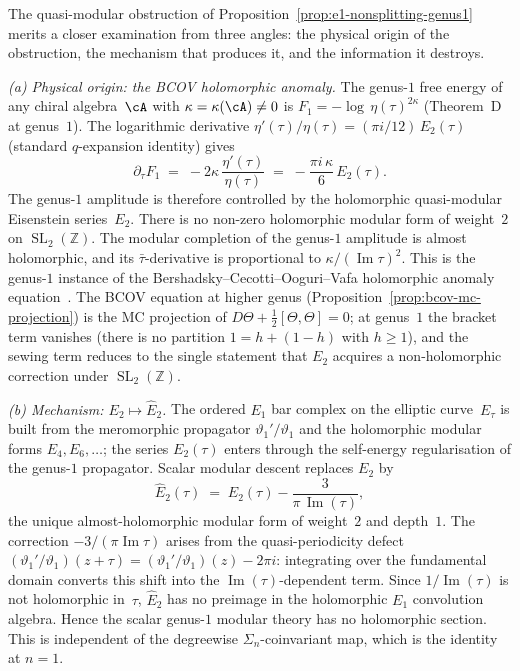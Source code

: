 \begin{remark}
\label{rem:genus1-nonsplitting-anomaly}
The quasi-modular obstruction of
Proposition~\ref{prop:e1-nonsplitting-genus1} merits a closer
examination from three angles: the physical origin of the
obstruction, the mechanism that produces it, and the information
it destroys.

\emph{(a) Physical origin: the BCOV holomorphic anomaly.}
The genus-$1$ free energy of any chiral algebra~$\cA$ with
$\kappa = \kappa(\cA) \neq 0$ is
$F_1 = -\log\,\eta(\tau)^{2\kappa}$
\textup{(}Theorem~D at genus~$1$\textup{)}.
The logarithmic derivative
$\eta'(\tau)/\eta(\tau) = (\pi i/12)\,E_2(\tau)$
\textup{(}standard $q$-expansion identity\textup{)} gives
\[
 \partial_\tau F_1
 \;=\;
 -2\kappa\,\frac{\eta'(\tau)}{\eta(\tau)}
 \;=\;
 -\frac{\pi i\,\kappa}{6}\,E_2(\tau).
\]
The genus-$1$ amplitude is therefore controlled by the holomorphic
quasi-modular Eisenstein series~$E_2$.  There is no non-zero
holomorphic modular form of weight~$2$ on
$\operatorname{SL}_2(\mathbb{Z})$.  The modular completion of the
genus-$1$ amplitude is almost holomorphic, and its
$\bar{\tau}$-derivative is proportional to
$\kappa/(\operatorname{Im}\tau)^2$.  This is the genus-$1$ instance
of the Bershadsky--Cecotti--Ooguri--Vafa holomorphic anomaly
equation~\cite{BCOV93}.
The BCOV equation at higher genus
\textup{(}Proposition~\ref{prop:bcov-mc-projection}\textup{)}
is the MC projection of $D\Theta + \frac{1}{2}[\Theta,\Theta] = 0$;
at genus~$1$ the bracket term vanishes
\textup{(}there is no partition $1 = h + (1-h)$ with
$h \geq 1$\textup{)}, and the sewing term reduces to the
single statement that $E_2$ acquires a non-holomorphic
correction under $\operatorname{SL}_2(\mathbb{Z})$.

\emph{(b) Mechanism: $E_2 \longmapsto \widehat{E}_2$.}
The ordered $E_1$ bar complex on the elliptic curve~$E_\tau$
is built from the meromorphic propagator
$\vartheta_1'/\vartheta_1$ and the holomorphic modular forms
$E_4, E_6, \ldots$; the series $E_2(\tau)$ enters through the
self-energy regularisation of the genus-$1$ propagator.
Scalar modular descent replaces $E_2$ by
\[
 \widehat{E}_2(\tau)
 \;=\;
 E_2(\tau) - \frac{3}{\pi\,\operatorname{Im}(\tau)},
\]
the unique almost-holomorphic modular form of weight~$2$ and
depth~$1$. The correction $-3/(\pi\operatorname{Im}\tau)$
arises from the quasi-periodicity defect
$(\vartheta_1'/\vartheta_1)(z + \tau)
= (\vartheta_1'/\vartheta_1)(z) - 2\pi i$: integrating over
the fundamental domain converts this shift into the
$\operatorname{Im}(\tau)$-dependent term. Since
$1/\operatorname{Im}(\tau)$ is not holomorphic in~$\tau$,
$\widehat{E}_2$ has no preimage in the holomorphic $E_1$
convolution algebra.  Hence the scalar genus-$1$ modular theory has
no holomorphic section.  This is independent of the degreewise
$\Sigma_n$-coinvariant map, which is the identity at $n=1$.


\end{remark}
